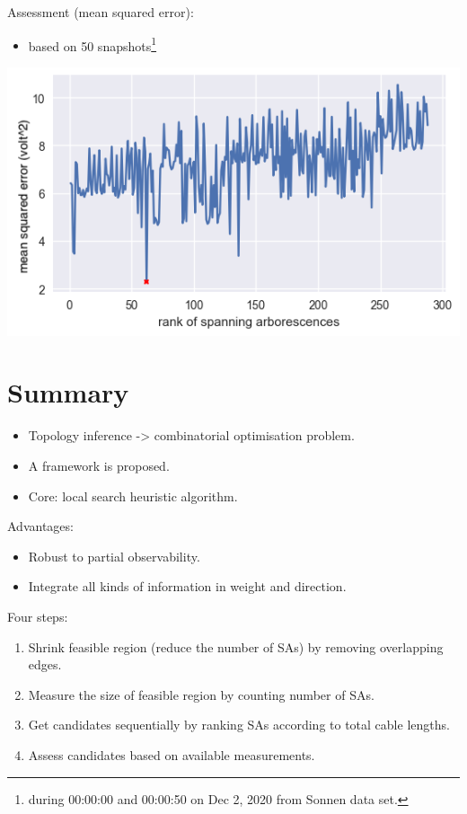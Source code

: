 \documentclass[
]{book}
\providecommand{\tightlist}{%
  \setlength{\itemsep}{0pt}\setlength{\parskip}{0pt}}
\begin{document}
Assessment (mean squared error):

\begin{itemize}
\tightlist
\item
  based on 50 snapshots\footnote{during 00:00:00 and 00:00:50 on Dec 2, 2020 from
    Sonnen data set.}
\end{itemize}

\begin{center}\includegraphics{Pictures/errors_288} \end{center}

\hypertarget{summary}{%
\section{Summary}\label{summary}}

\begin{itemize}
\tightlist
\item
  Topology inference -\textgreater{} combinatorial optimisation problem.
\item
  A framework is proposed.
\item
  Core: local search heuristic algorithm.
\end{itemize}

Advantages:

\begin{itemize}
\tightlist
\item
  Robust to partial observability.
\item
  Integrate all kinds of information in weight and direction.
\end{itemize}

Four steps:

\begin{enumerate}
\def\labelenumi{\arabic{enumi}.}
\tightlist
\item
  Shrink feasible region (reduce the number of SAs) by removing overlapping
  edges.
\item
  Measure the size of feasible region by counting number of SAs.
\item
  Get candidates sequentially by ranking SAs according to total cable lengths.
\item
  Assess candidates based on available measurements.
\end{enumerate}
\end{document}
